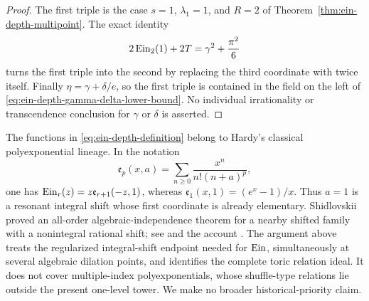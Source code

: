 \begin{proof}
The first triple is the case \(s=1\), \(\lambda_1=1\), and \(R=2\) of
Theorem~\ref{thm:ein-depth-multipoint}.  The exact identity
\[
 2\operatorname{Ein}_{2}(1)+2T=\gamma^2+\frac{\pi^2}{6}
\]
turns the first triple into the second by replacing the third coordinate
with twice itself.  Finally
\(\eta=\gamma+\delta/e\), so the first triple is contained in the field
on the left of \eqref{eq:ein-depth-gamma-delta-lower-bound}.
No individual irrationality or transcendence conclusion for \(\gamma\)
or \(\delta\) is asserted.
\end{proof}

\begin{remark}
The functions in \eqref{eq:ein-depth-definition} belong to Hardy's
classical polyexponential lineage.  In the notation
\[
 \mathfrak e_p(x,a)=\sum_{n\geq0}\frac{x^n}{n!(n+a)^p},
\]
one has
\(\operatorname{Ein}_{r}(z)=z\mathfrak e_{r+1}(-z,1)\), whereas
\(\mathfrak e_1(x,1)=(e^x-1)/x\).  Thus \(a=1\) is a resonant integral
shift whose first coordinate is already elementary.  Shidlovskii proved an all-order
algebraic-independence theorem for a nearby shifted family with a
nonintegral rational shift; see \cite[Sec.~7.3.3]{Shidlovskii1989} and the
account \cite[Sec.~9]{Boyadzhiev2007}.  The argument above treats the
regularized integral-shift endpoint needed for \(\operatorname{Ein}\), simultaneously at
several algebraic dilation points, and identifies the complete toric
relation ideal.
It does not cover multiple-index polyexponentials, whose shuffle-type
relations lie outside the present one-level tower.  We make no broader
historical-priority claim.
\end{remark}
